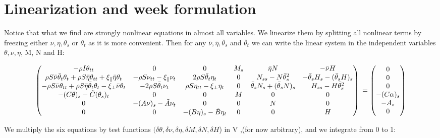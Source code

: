 
\usepackage{pdfsync}
\usepackage{amsmath}
\usepackage{graphicx}

\section{Linearization and week formulation}

Notice that what we find are strongly nonlinear equations in almost all variables.
We linearize them by splitting all nonlinear terms by freezing either $\nu, \eta, \theta_s$ or $\theta_t$ as it is more convenient. Then for any $\bar{\nu}, \bar{\eta}, \bar{\theta}_s$ and $\bar{\theta}_t$ we can write the linear system in the independent variables $\theta, \nu, \eta$, M, N and H:

\[\begin{pmatrix}
-\rho I \theta_{tt} & 0 & 0 & M_s & \bar{\eta}N & -\bar{\nu}H \\
\rho S\bar{\nu}\bar{\theta}_t\theta_t + \rho S \bar{\eta}\theta_{tt} + \xi_{\parallel}\bar{\eta}\theta_t & -\rho S \nu_{tt} -\xi_{\parallel}\nu_t & 2 \rho S\bar{\theta}_t\eta_t & 0 & N_{ss} - N\bar{\theta}_s^2 & -\bar{\theta}_s H_s - (\bar{\theta}_s H)_s \\
-\rho S \bar{\nu}\theta_{tt} + \rho S \bar{\eta}\bar{\theta}_t\theta_t - \xi_{\perp}\bar{\nu}\theta_t & - 2\rho S \bar{\theta}_t \nu_t & \rho S \eta_{tt} - \xi_{\perp}\eta_t & 0 & \bar{\theta}_s N_s + (\bar{\theta}_s N)_s & H_{ss}-H\bar{\theta}_s^2 \\
-(C\theta)_s -\tilde{C}(\theta_s)_t& 0 & 0 & M & 0 & 0 \\
0 & -(A\nu)_s -\tilde{A}\nu_t & 0 & 0 & N & 0 \\
0 & 0 & -(B\eta)_s - \tilde{B}\eta_t & 0 & 0 & H 
\end{pmatrix}
\\ =
\begin{pmatrix}
0\\
0\\
0\\
-(C\alpha)_s\\
-A_s\\
0
\end{pmatrix}\]

We multiply the six equations by test functions
$(\delta \theta, \delta\nu, \delta \eta, \delta M,\delta N, \delta H$) in V ,(for now arbitrary), and we integrate from 0 to 1: 

